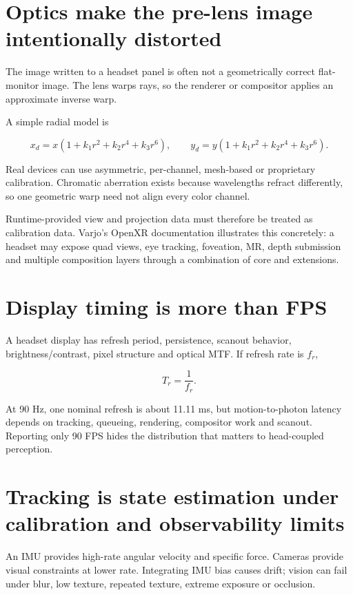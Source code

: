 \section{Optics make the pre-lens image intentionally distorted}\label{04-visual-computing-ii-ch035-optics-make-the-pre-lens-image-intentionally-distorted}

The image written to a headset panel is often not a geometrically correct flat-monitor image. The lens warps rays, so the renderer or compositor applies an approximate inverse warp.

A simple radial model is

\[
x_d=x(1+k_1r^2+k_2r^4+k_3r^6), \qquad
y_d=y(1+k_1r^2+k_2r^4+k_3r^6).
\]

Real devices can use asymmetric, per-channel, mesh-based or proprietary calibration. Chromatic aberration exists because wavelengths refract differently, so one geometric warp need not align every color channel.

Runtime-provided view and projection data must therefore be treated as calibration data. Varjo's OpenXR documentation illustrates this concretely: a headset may expose quad views, eye tracking, foveation, MR, depth submission and multiple composition layers through a combination of core and extensions.

\section{Display timing is more than FPS}\label{04-visual-computing-ii-ch035-display-timing-is-more-than-fps}

A headset display has refresh period, persistence, scanout behavior, brightness/contrast, pixel structure and optical MTF. If refresh rate is \(f_r\),

\[
T_r=\frac{1}{f_r}.
\]

At 90 Hz, one nominal refresh is about 11.11 ms, but motion-to-photon latency depends on tracking, queueing, rendering, compositor work and scanout. Reporting only 90 FPS hides the distribution that matters to head-coupled perception.

\section{Tracking is state estimation under calibration and observability limits}\label{04-visual-computing-ii-ch035-tracking-is-state-estimation-under-calibration-and-observability-limits}

An IMU provides high-rate angular velocity and specific force. Cameras provide visual constraints at lower rate. Integrating IMU bias causes drift; vision can fail under blur, low texture, repeated texture, extreme exposure or occlusion.

